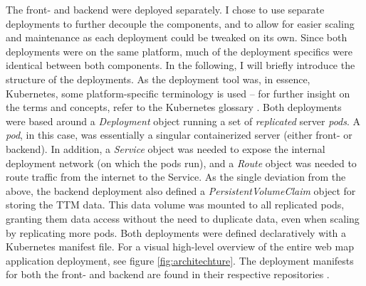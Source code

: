 The front- and backend were deployed separately.
I chose to use separate deployments to further decouple the components,
and to allow for easier scaling and maintenance as each deployment could be tweaked on its own.
Since both deployments were on the same platform,
much of the deployment specifics were identical between both components.
In the following, I will briefly introduce the structure of the deployments.
As the deployment tool was, in essence, Kubernetes,
some platform-specific terminology is used --
for further insight on the terms and concepts,
refer to the Kubernetes glossary \parencite{kubernetesglossary}.
Both deployments were based around a \textit{Deployment} object
running a set of \textit{replicated} server \textit{pods}.
A \textit{pod}, in this case,
was essentially a singular containerized server (either front- or backend).
In addition, a \textit{Service} object was needed to expose
the internal deployment network (on which the pods run),
and a \textit{Route} object was needed to route traffic from the internet to the Service.
As the single deviation from the above, the backend deployment also defined a
\textit{PersistentVolumeClaim} object for storing the TTM data.
This data volume was mounted to all replicated pods, granting them data access
without the need to duplicate data, even when scaling by replicating more pods.
Both deployments were defined declaratively with a Kubernetes manifest file.
For a visual high-level overview of the entire web map application deployment,
see figure \ref{fig:architechture}.
The deployment manifests for both the front- and backend are found in their respective repositories
.

